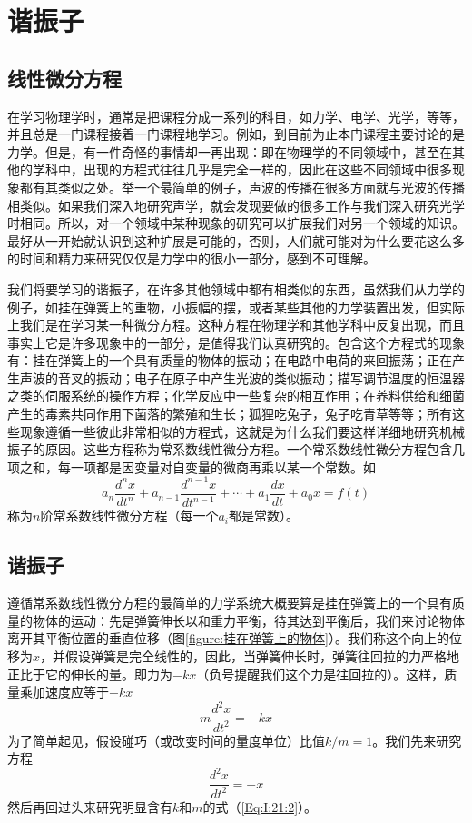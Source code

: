 \chapter{谐振子}

\section{线性微分方程}

在学习物理学时，通常是把课程分成一系列的科目，如力学、电学、光学，等等，并且总是一门课程接着一门课程地学习。例如，到目前为止本门课程主要讨论的是力学。但是，有一件奇怪的事情却一再出现：即在物理学的不同领域中，甚至在其他的学科中，出现的方程式往往几乎是完全一样的，因此在这些不同领域中很多现象都有其类似之处。举一个最简单的例子，声波的传播在很多方面就与光波的传播相类似。如果我们深入地研究声学，就会发现要做的很多工作与我们深入研究光学时相同。所以，对一个领域中某种现象的研究可以扩展我们对另一个领域的知识。最好从一开始就认识到这种扩展是可能的，否则，人们就可能对为什么要花这么多的时间和精力来研究仅仅是力学中的很小一部分，感到不可理解。

我们将要学习的谐振子，在许多其他领域中都有相类似的东西，虽然我们从力学的例子，如挂在弹簧上的重物，小振幅的摆，或者某些其他的力学装置出发，但实际上我们是在学习某一种微分方程。这种方程在物理学和其他学科中反复出现，而且事实上它是许多现象中的一部分，是值得我们认真研究的。包含这个方程式的现象有：挂在弹簧上的一个具有质量的物体的振动；在电路中电荷的来回振荡；正在产生声波的音叉的振动；电子在原子中产生光波的类似振动；描写调节温度的恒温器之类的伺服系统的操作方程；化学反应中一些复杂的相互作用；在养料供给和细菌产生的毒素共同作用下菌落的繁殖和生长；狐狸吃兔子，兔子吃青草等等；所有这些现象遵循一些彼此非常相似的方程式，这就是为什么我们要这样详细地研究机械振子的原因。这些方程称为常系数线性微分方程。一个常系数线性微分方程包含几项之和，每一项都是因变量对自变量的微商再乘以某一个常数。如
\begin{equation}
    \label{Eq:I:21:1}
    a_n \frac{d^nx}{dt^n} + a_{n-1} \frac{d^{n-1}x}{dt^{n-1}} + \cdots + a_1 \frac{dx}{dt} + a_0x = f(t)
\end{equation}
称为$n$阶常系数线性微分方程（每一个$a_i$都是常数）。

\section{谐振子}

遵循常系数线性微分方程的最简单的力学系统大概要算是挂在弹簧上的一个具有质量的物体的运动：先是弹簧伸长以和重力平衡，待其达到平衡后，我们来讨论物体离开其平衡位置的垂直位移（图\ref{figure:挂在弹簧上的物体}）。我们称这个向上的位移为$x$，并假设弹簧是完全线性的，因此，当弹簧伸长时，弹簧往回拉的力严格地正比于它的伸长的量。即力为$-kx$（负号提醒我们这个力是往回拉的）。这样，质量乘加速度应等于$-kx$
\begin{equation}
    \label{Eq:I:21:2}
    m\frac{d^2x}{dt^2} = -kx
\end{equation}
为了简单起见，假设碰巧（或改变时间的量度单位）比值$k/m=1$。我们先来研究方程
\begin{equation}
    \label{Eq:I:21:3}
    \frac{d^2x}{dt^2} = -x
\end{equation}
然后再回过头来研究明显含有$k$和$m$的式（\ref{Eq:I:21:2}）。

